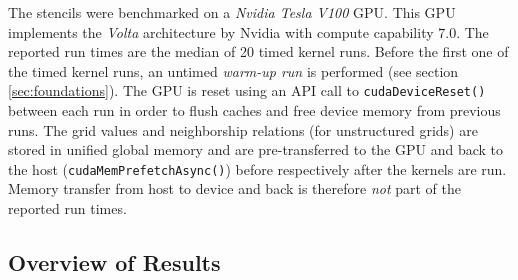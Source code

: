 The stencils were benchmarked on a \emph{Nvidia Tesla V100} GPU. This GPU implements the \emph{Volta} architecture by Nvidia with compute capability $7.0$. The reported run times are the median of 20 timed kernel runs. Before the first one of the timed kernel runs, an untimed \emph{warm-up run} is performed (see section \ref{sec:foundations}). The GPU is reset using an API call to \texttt{cudaDeviceReset()} between each run in order to flush caches and free device memory from previous runs. The grid values and neighborship relations (for unstructured grids) are stored in unified global memory and are pre-transferred to the GPU and back to the host (\texttt{cudaMemPrefetchAsync()}) before respectively after the kernels are run. Memory transfer from host to device and back is therefore \emph{not} part of the reported run times.

\subsection{Overview of Results}

